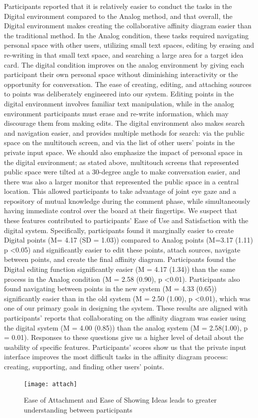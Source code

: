 \documentclass{sigchi}
\begin{document}
Participants reported that it is relatively easier to conduct the tasks in the Digital environment compared to the Analog method, and that overall, the Digital environment makes creating the collaborative affinity diagram easier than the traditional method. In the Analog condition, these tasks required navigating personal space with other users, utilizing small text spaces, editing by erasing and re-writing in that small text space, and searching a large area for a target idea card. The digital condition improves on the analog environment by giving each participant their own personal space without diminishing interactivity or the opportunity for conversation. The ease of creating, editing, and attaching sources to points was deliberately engineered into our system. Editing points in the digital environment involves familiar text manipulation, while in the analog environment participants must erase and re-write information, which may discourage them from making edits. The digital environment also makes search and navigation easier, and provides multiple methods for search: via the public space on the multitouch screen, and via the list of other users' points in the private input space. We should also emphasize the impact of personal space in the digital environment; as stated above, multitouch screens that represented public space were tilted at a 30-degree angle to make conversation easier, and there was also a larger monitor that represented the public space in a central location. This allowed participants to take advantage of joint eye gaze and a repository of mutual knowledge during the comment phase, while simultaneously having immediate control over the board at their fingertips. We suspect that these features contributed to participants' Ease of Use and Satisfaction with the digital system. Specifically, participants found it marginally easier to create Digital points (M= 4.17 (SD = 1.03)) compared to Analog points (M=3.17 (1.11) p \textless 0.05) and significantly easier to edit these points, attach sources, navigate between points, and create the final affinity diagram.  Participants found the Digital editing function significantly easier (M = 4.17 (1.34)) than the same process in the Analog condition (M = 2.58 (0.90), p \textless 0.01). Participants also found navigating between points in the new system (M = 4.33 (0.65)) significantly easier than in the old system (M = 2.50 (1.00), p \textless 0.01), which was one of our primary goals in designing the system. These results are aligned with participants' reports that collaborating on the affinity diagram was easier using the digital system (M = 4.00 (0.85)) than the analog system (M = 2.58(1.00), p = 0.01). Responses to these questions give us a higher level of detail about the usability of specific features. Participants' scores show us that the private input interface improves the most difficult tasks in the affinity diagram process: creating, supporting, and finding other users' points. 
\begin{figure}[!h]
\centering
\texttt{[image: attach]}
\caption{Ease of Attachment and Ease of Showing Ideas leads to greater understanding between participants}
\label{fig:figure1}
\end{figure}
\end{document}
